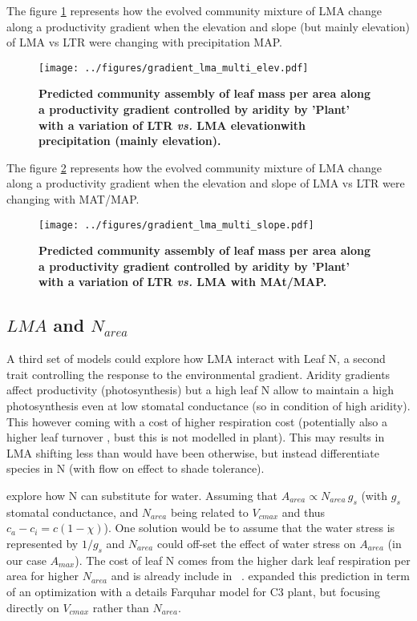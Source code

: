 \documentclass[a4paper,11pt]{article}
\begin{document}
The figure \ref{fig:lma_map} represents how the evolved community mixture of LMA change along a productivity gradient when the elevation and slope (but mainly elevation) of LMA vs LTR were changing with precipitation MAP.

\begin{figure}[ht]
\centering
\texttt{[image: ../figures/gradient\_lma\_multi\_elev.pdf]}
\caption{\textbf{Predicted community assembly of leaf mass per area along a productivity gradient controlled by aridity by 'Plant' with a variation of LTR \textit{vs.} LMA elevationwith precipitation (mainly elevation).}
\label{fig:lma_map}}
\end{figure}

The figure \ref{fig:lma_mat_o_map} represents how the evolved community mixture of LMA change along a productivity gradient when the elevation and slope of LMA vs LTR were changing with MAT/MAP.

\begin{figure}[ht]
\centering
\texttt{[image: ../figures/gradient\_lma\_multi\_slope.pdf]}
\caption{\textbf{Predicted community assembly of leaf mass per area along a productivity gradient controlled by aridity by 'Plant' with a variation of LTR \textit{vs.} LMA with MAt/MAP.}
\label{fig:lma_mat_o_map}}
\end{figure}


\clearpage

\subsection{$LMA$ and $N_{area}$}

A third set of models could explore how LMA interact with Leaf N, a second trait controlling the response to the environmental gradient. Aridity gradients affect productivity (photosynthesis) but a
high leaf N allow to maintain a high photosynthesis even at low stomatal conductance (so in condition of high aridity). This however coming with a cost of higher respiration cost (potentially also a higher leaf turnover \citep{Wright-2002a,Wright-2002b}, bust this is not modelled in plant). This may results in LMA shifting less than would have been otherwise, but instead differentiate species in N (with flow on effect to shade tolerance).


 \citet{Wright-2003} explore how N can substitute for water. Assuming that $A_{area} \propto N_{area} \, g_s$ (with $g_s$ stomatal conductance, and $N_{area}$ being related to $V_{cmax}$ and thus $c_a - c_i = c(1-\chi)$). One solution would be to assume that the water stress is represented by $1/g_s$ and $N_{area}$ could off-set the effect of water stress on $A_{area}$ (in our case $A_{max}$). The cost of leaf N comes from the higher dark leaf respiration per area for higher $N_{area}$ and is already include in \plant\ . \citet{Prentice-2014} expanded this prediction in term of an optimization with a details Farquhar model for C3 plant, but focusing directly on $V_{cmax}$ rather than $N_{area}$.
\end{document}
